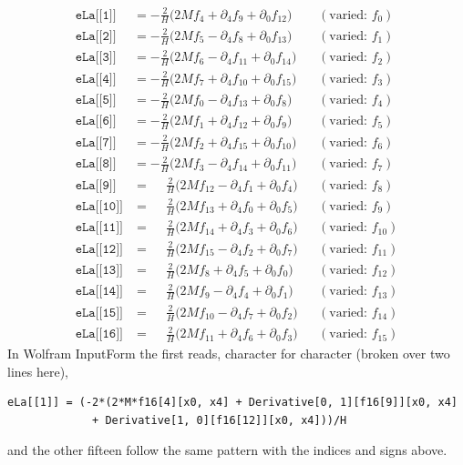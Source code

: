 \begin{align*}
\texttt{eLa[[1]]} &= -\tfrac{2}{H}\bigl(2Mf_{4}+\partial_4f_{9}+\partial_0f_{12}\bigr) &&(\text{varied: }f_{0})\\
\texttt{eLa[[2]]} &= -\tfrac{2}{H}\bigl(2Mf_{5}-\partial_4f_{8}+\partial_0f_{13}\bigr) &&(\text{varied: }f_{1})\\
\texttt{eLa[[3]]} &= -\tfrac{2}{H}\bigl(2Mf_{6}-\partial_4f_{11}+\partial_0f_{14}\bigr) &&(\text{varied: }f_{2})\\
\texttt{eLa[[4]]} &= -\tfrac{2}{H}\bigl(2Mf_{7}+\partial_4f_{10}+\partial_0f_{15}\bigr) &&(\text{varied: }f_{3})\\
\texttt{eLa[[5]]} &= -\tfrac{2}{H}\bigl(2Mf_{0}-\partial_4f_{13}+\partial_0f_{8}\bigr) &&(\text{varied: }f_{4})\\
\texttt{eLa[[6]]} &= -\tfrac{2}{H}\bigl(2Mf_{1}+\partial_4f_{12}+\partial_0f_{9}\bigr) &&(\text{varied: }f_{5})\\
\texttt{eLa[[7]]} &= -\tfrac{2}{H}\bigl(2Mf_{2}+\partial_4f_{15}+\partial_0f_{10}\bigr) &&(\text{varied: }f_{6})\\
\texttt{eLa[[8]]} &= -\tfrac{2}{H}\bigl(2Mf_{3}-\partial_4f_{14}+\partial_0f_{11}\bigr) &&(\text{varied: }f_{7})\\
\texttt{eLa[[9]]} &= \phantom{-}\tfrac{2}{H}\bigl(2Mf_{12}-\partial_4f_{1}+\partial_0f_{4}\bigr) &&(\text{varied: }f_{8})\\
\texttt{eLa[[10]]} &= \phantom{-}\tfrac{2}{H}\bigl(2Mf_{13}+\partial_4f_{0}+\partial_0f_{5}\bigr) &&(\text{varied: }f_{9})\\
\texttt{eLa[[11]]} &= \phantom{-}\tfrac{2}{H}\bigl(2Mf_{14}+\partial_4f_{3}+\partial_0f_{6}\bigr) &&(\text{varied: }f_{10})\\
\texttt{eLa[[12]]} &= \phantom{-}\tfrac{2}{H}\bigl(2Mf_{15}-\partial_4f_{2}+\partial_0f_{7}\bigr) &&(\text{varied: }f_{11})\\
\texttt{eLa[[13]]} &= \phantom{-}\tfrac{2}{H}\bigl(2Mf_{8}+\partial_4f_{5}+\partial_0f_{0}\bigr) &&(\text{varied: }f_{12})\\
\texttt{eLa[[14]]} &= \phantom{-}\tfrac{2}{H}\bigl(2Mf_{9}-\partial_4f_{4}+\partial_0f_{1}\bigr) &&(\text{varied: }f_{13})\\
\texttt{eLa[[15]]} &= \phantom{-}\tfrac{2}{H}\bigl(2Mf_{10}-\partial_4f_{7}+\partial_0f_{2}\bigr) &&(\text{varied: }f_{14})\\
\texttt{eLa[[16]]} &= \phantom{-}\tfrac{2}{H}\bigl(2Mf_{11}+\partial_4f_{6}+\partial_0f_{3}\bigr) &&(\text{varied: }f_{15})
\end{align*}
In Wolfram InputForm the first reads, character for character (broken over two lines here),
\begin{footnotesize}
\begin{verbatim}
eLa[[1]] = (-2*(2*M*f16[4][x0, x4] + Derivative[0, 1][f16[9]][x0, x4]
             + Derivative[1, 0][f16[12]][x0, x4]))/H
\end{verbatim}
\end{footnotesize}
and the other fifteen follow the same pattern with the indices and signs above.


